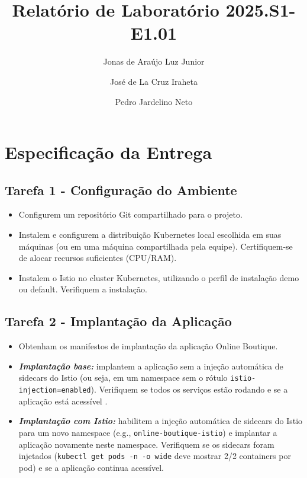\documentclass[9pt,a4paper,twocolumn,twoside]{tau-class/tau}
\title{Relatório de Laboratório 2025.S1-E1.01}
\author[a,1]{Jonas de Araújo Luz Junior}
\author[a,2]{José de La Cruz Iraheta}
\author[a,3]{Pedro Jardelino Neto}
\affil[a]{Universidade de Fortaleza (Unifor)}
\begin{document}
		
    \maketitle 
    \thispagestyle{firststyle} 
    \tauabstract 
    

\section{Especificação da Entrega}

\subsection{Tarefa 1 - Configuração do Ambiente}
\begin{itemize}
    \item Configurem um repositório Git compartilhado para o projeto.
    \item Instalem e configurem a distribuição Kubernetes local escolhida em suas máquinas (ou em uma máquina compartilhada pela equipe). Certifiquem-se de alocar recursos suficientes (CPU/RAM).
    \item Instalem o Istio no cluster Kubernetes, utilizando o perfil de instalação demo ou default. Verifiquem a instalação.
\end{itemize}

\subsection{Tarefa 2 - Implantação da Aplicação}
\begin{itemize}
    \item Obtenham os manifestos de implantação da aplicação Online Boutique.
    \item \textbf{\textit{Implantação base:}} implantem a aplicação sem a injeção automática de sidecars do Istio (ou seja, em um namespace sem o rótulo \texttt{istio-injection=enabled}). Verifiquem se todos os serviços estão rodando e se a aplicação está acessível .
    \item \textbf{\textit{Implantação com Istio:}} habilitem a injeção automática de sidecars do Istio para um novo namespace (e.g., \texttt{online-boutique-istio}) e implantar a aplicação novamente neste namespace. Verifiquem se os sidecars foram injetados (\texttt{kubectl get pods -n -o wide} deve mostrar 2/2 containers por pod) e se a aplicação continua acessível.
\end{itemize}
\end{document}
